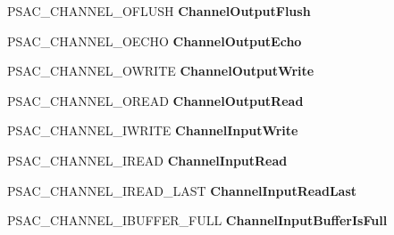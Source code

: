 \begin{DoxyCompactItemize}
\item 
\mbox{\label{struct___s_a_c___c_h_a_n_n_e_l_a75353a5be3abdf43e170ab03abcb9971}} 
P\+S\+A\+C\+\_\+\+C\+H\+A\+N\+N\+E\+L\+\_\+\+O\+F\+L\+U\+SH {\bfseries Channel\+Output\+Flush}
\item 
\mbox{\label{struct___s_a_c___c_h_a_n_n_e_l_a02fd7130efad2d4c88c7b1ee9a2236c2}} 
P\+S\+A\+C\+\_\+\+C\+H\+A\+N\+N\+E\+L\+\_\+\+O\+E\+C\+HO {\bfseries Channel\+Output\+Echo}
\item 
\mbox{\label{struct___s_a_c___c_h_a_n_n_e_l_acf6c7c4c390610a1e89b947445f80f8c}} 
P\+S\+A\+C\+\_\+\+C\+H\+A\+N\+N\+E\+L\+\_\+\+O\+W\+R\+I\+TE {\bfseries Channel\+Output\+Write}
\item 
\mbox{\label{struct___s_a_c___c_h_a_n_n_e_l_a162d255213f9b7bf3de84afe934fb10e}} 
P\+S\+A\+C\+\_\+\+C\+H\+A\+N\+N\+E\+L\+\_\+\+O\+R\+E\+AD {\bfseries Channel\+Output\+Read}
\item 
\mbox{\label{struct___s_a_c___c_h_a_n_n_e_l_a3e8777ccf36af69d591c89ed651042cd}} 
P\+S\+A\+C\+\_\+\+C\+H\+A\+N\+N\+E\+L\+\_\+\+I\+W\+R\+I\+TE {\bfseries Channel\+Input\+Write}
\item 
\mbox{\label{struct___s_a_c___c_h_a_n_n_e_l_a794fca8d653f6bcb1c989e11becb65ba}} 
P\+S\+A\+C\+\_\+\+C\+H\+A\+N\+N\+E\+L\+\_\+\+I\+R\+E\+AD {\bfseries Channel\+Input\+Read}
\item 
\mbox{\label{struct___s_a_c___c_h_a_n_n_e_l_a7aacfb64a34c0654c63dbe7cd86ecc13}} 
P\+S\+A\+C\+\_\+\+C\+H\+A\+N\+N\+E\+L\+\_\+\+I\+R\+E\+A\+D\+\_\+\+L\+A\+ST {\bfseries Channel\+Input\+Read\+Last}
\item 
\mbox{\label{struct___s_a_c___c_h_a_n_n_e_l_acc293f07f50252a7ae9140e8bd761c82}} 
P\+S\+A\+C\+\_\+\+C\+H\+A\+N\+N\+E\+L\+\_\+\+I\+B\+U\+F\+F\+E\+R\+\_\+\+F\+U\+LL {\bfseries Channel\+Input\+Buffer\+Is\+Full}
\item 
\mbox{\label{struct___s_a_c___c_h_a_n_n_e_l_ad9e4a3587f75eae6e2222237571847e3}} 

\end{DoxyCompactItemize}
